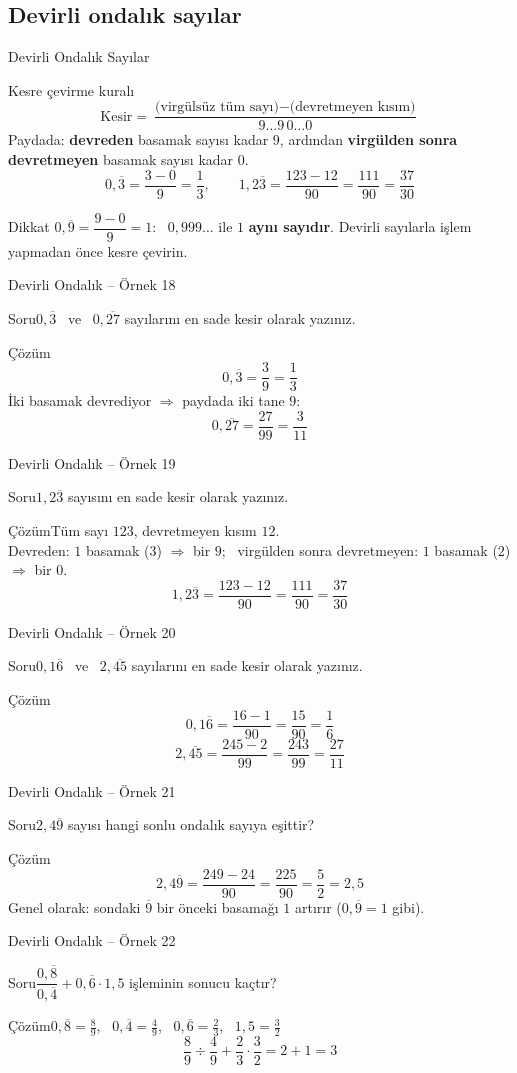 \documentclass[aspectratio=169,11pt]{beamer}
\newcommand{\soru}[3]{%
\begin{frame}{#1}
  \begin{block}{Soru}\large #2\end{block}
  \pause
  \begin{exampleblock}{Çözüm}\large #3\end{exampleblock}
\end{frame}}
\newcommand{\ab}[1]{\overline{#1}}
\begin{document}
\subsection{Devirli ondalık sayılar}
\begin{frame}{Devirli Ondalık Sayılar}
\begin{block}{Kesre çevirme kuralı}
\[\text{Kesir}=\frac{\text{(virgülsüz tüm sayı)}-\text{(devretmeyen kısım)}}{9\ldots9\,0\ldots0}\]
\vspace{-4pt}
Paydada: \textbf{devreden} basamak sayısı kadar \(9\), ardından \textbf{virgülden sonra devretmeyen} basamak sayısı kadar \(0\).
\[0{,}\ab{3}=\frac{3-0}{9}=\frac{1}{3},\qquad 1{,}2\ab{3}=\frac{123-12}{90}=\frac{111}{90}=\frac{37}{30}\]
\end{block}
\begin{alertblock}{Dikkat}
\(0{,}\ab{9}=\dfrac{9-0}{9}=1\): \ \(0{,}999\ldots\) ile \(1\) \textbf{aynı sayıdır}. \quad Devirli sayılarla işlem yapmadan önce kesre çevirin.
\end{alertblock}
\end{frame}

\soru{Devirli Ondalık -- Örnek 18}
{\(0{,}\ab{3}\) \ ve \ \(0{,}\ab{27}\) sayılarını en sade kesir olarak yazınız.}
{\[0{,}\ab{3}=\frac{3}{9}=\frac{1}{3}\]
İki basamak devrediyor \(\Rightarrow\) paydada iki tane \(9\):
\[0{,}\ab{27}=\frac{27}{99}=\frac{3}{11}\]}

\soru{Devirli Ondalık -- Örnek 19}
{\(1{,}2\ab{3}\) sayısını en sade kesir olarak yazınız.}
{Tüm sayı \(123\), devretmeyen kısım \(12\).\\
Devreden: \(1\) basamak (\(3\)) \(\Rightarrow\) bir \(9\); \ virgülden sonra devretmeyen: \(1\) basamak (\(2\)) \(\Rightarrow\) bir \(0\).
\[1{,}2\ab{3}=\frac{123-12}{90}=\frac{111}{90}=\frac{37}{30}\]}

\soru{Devirli Ondalık -- Örnek 20}
{\(0{,}1\ab{6}\) \ ve \ \(2{,}\ab{45}\) sayılarını en sade kesir olarak yazınız.}
{\[0{,}1\ab{6}=\frac{16-1}{90}=\frac{15}{90}=\frac{1}{6}\]
\[2{,}\ab{45}=\frac{245-2}{99}=\frac{243}{99}=\frac{27}{11}\]}

\soru{Devirli Ondalık -- Örnek 21}
{\(2{,}4\ab{9}\) sayısı hangi sonlu ondalık sayıya eşittir?}
{\[2{,}4\ab{9}=\frac{249-24}{90}=\frac{225}{90}=\frac{5}{2}=2{,}5\]
Genel olarak: sondaki \(\ab{9}\) bir önceki basamağı \(1\) artırır (\(0{,}\ab{9}=1\) gibi).}

\soru{Devirli Ondalık -- Örnek 22}
{\(\dfrac{0{,}\ab{8}}{0{,}\ab{4}}+0{,}\ab{6}\cdot 1{,}5\) işleminin sonucu kaçtır?}
{\(0{,}\ab{8}=\frac{8}{9}\), \ \(0{,}\ab{4}=\frac{4}{9}\), \ \(0{,}\ab{6}=\frac{2}{3}\), \ \(1{,}5=\frac{3}{2}\)
\[\frac{8}{9}\div\frac{4}{9}+\frac{2}{3}\cdot\frac{3}{2}=2+1=3\]}
\end{document}
